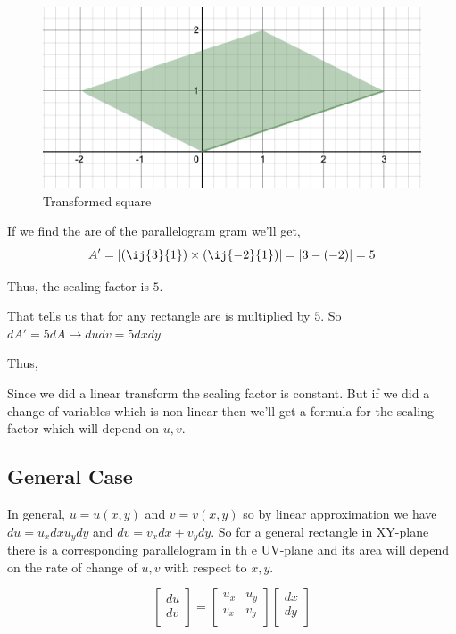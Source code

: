 \begin{figure}[ht!]
    \centering
    \includegraphics[scale=0.5]{./images/lecture_14_figure_3.png}
    \caption{Transformed square}
\end{figure}

If we find the are of the parallelogram gram we'll get, 
$$
A' = |(\ij{3}{1}) \times (\ij{-2}{1})| = |3 - (-2)| = 5
$$

Thus, the scaling factor is $5$. 

That tells us that for any rectangle are is multiplied by $5$.
So $ dA' = 5 dA \rightarrow du dv = 5 dx dy $

Thus, 

Since we did a linear transform the scaling factor is constant. 
But if we did a change of variables which is non-linear then we'll get a formula for the scaling factor which will depend on $u, v$.

\subsection{General Case}

In general, $u = u(x, y)$ and $v = v(x, y)$ so by linear approximation we have $du = u_x dx u_y dy$ and $dv = v_x dx + v_y dy$. 
So for a general rectangle in XY-plane there is a corresponding parallelogram in th e UV-plane and its area will depend on the rate of change of $u, v$ with respect to $x, y$.

$$
\begin{bmatrix}
    du \\ dv \\
\end{bmatrix}
=
\begin{bmatrix}
    u_x & u_y \\
    v_x & v_y \\
\end{bmatrix}
\begin{bmatrix}
    dx \\ dy \\
\end{bmatrix}
$$

